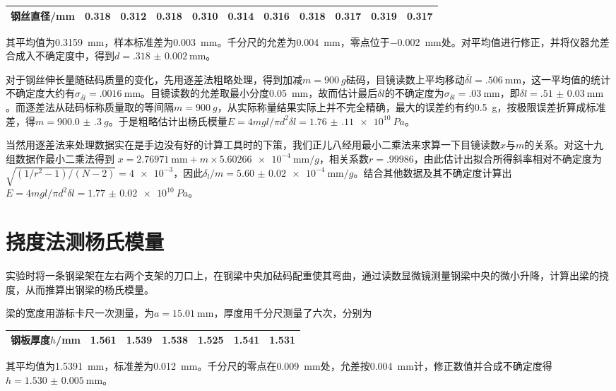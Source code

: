 \documentclass[UTF8]{ctexart}
\begin{document}
\noindent
\begin{tabu}{X[-10]|XXXXXXXXXX}
  \hline
  钢丝直径/mm&0.318	&0.312	&0.318	&0.310	&0.314	&0.316	&0.318	&0.317	&0.319	&0.317\\
  \hline
\end{tabu}

其平均值为\SI{.3159}{\mm}，样本标准差为\SI{.003}{\mm}。千分尺的允差为\SI{.004}{\mm}，零点位于\SI{-.002}{\mm}处。对平均值进行修正，并将仪器允差合成入不确定度中，得到$d=\SI{.318(2)}{\mm}$。

对于钢丝伸长量随砝码质量的变化，先用逐差法粗略处理，得到加减$m=\SI{900}{g}$砝码，目镜读数上平均移动$\overline{\delta l}=\SI{.506}{\mm}$，这一平均值的统计不确定度大约有$\sigma_{\overline{\delta l}}=\SI{.0016}{\mm}$。目镜读数的允差取最小分度\SI{0.05}{\mm}，故而估计最后$\delta l$的不确定度为$\sigma_{\delta l}=\SI{.03}{\mm}$，即$\delta l=\SI{.51(3)}{\mm}$。而逐差法从砝码标称质量取的等间隔$m=\SI{900}{g}$，从实际称量结果实际上并不完全精确，最大的误差约有约\SI{.5}{g}，按极限误差折算成标准差，得$m=\SI{900.0(3)}{g}$。于是粗略估计出杨氏模量$E=4mgl/\pi d^2\delta l=\SI{1.76(11)e10}{Pa}$。

当然用逐差法来处理数据实在是手边没有好的计算工具时的下策，我们正儿八经用最小二乘法来求算一下目镜读数$x$与$m$的关系。对这十九组数据作最小二乘法得到
$x=\SI{2.76971}{\mm}+m\times\SI{5.60266e-4}{\mm/g}$，相关系数$r=\num{.99986}$，由此估计出拟合所得斜率相对不确定度为$\sqrt{(1/r^2-1)/(N-2)}=\num{4e-3}$，因此$\delta_l/m=\SI{5.60(2)e-4}{\mm/g}$。结合其他数据及其不确定度计算出$E=4mgl/\pi d^2\delta l=\SI{1.77(2)e10}{Pa}$。

\section{挠度法测杨氏模量}
实验时将一条钢梁架在左右两个支架的刀口上，在钢梁中央加砝码配重使其弯曲，通过读数显微镜测量钢梁中央的微小升降，计算出梁的挠度，从而推算出钢梁的杨氏模量。

梁的宽度用游标卡尺一次测量，为$a=\SI{15.01}{\mm}$，厚度用千分尺测量了六次，分别为

\noindent
\begin{tabu} to 0.99\linewidth {X[-10]|XXXXXX}
\hline
钢板厚度$h$/mm&1.561	&1.539	&1.538	&1.525	&1.541	&1.531\\
\hline
\end{tabu}

其平均值为\SI{1.5391}{\mm}，标准差为\SI{.012}{\mm}。千分尺的零点在\SI{.009}{\mm}处，允差按\SI{.004}{\mm}计，修正数值并合成不确定度得$h=\SI{1.530(5)}{\mm}$。
\end{document}
